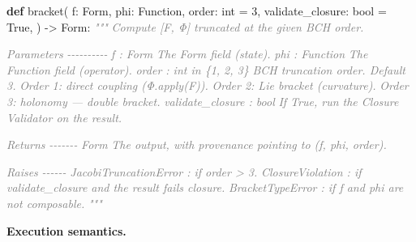\documentclass[11pt,a4paper]{article}
\newenvironment{Shaded}{\begin{snugshade}\small}{\end{snugshade}}
\newcommand{\KeywordTok}[1]{\textbf{#1}}
\newcommand{\DecValTok}[1]{#1}
\newcommand{\CommentTok}[1]{\textit{\textcolor{gray}{#1}}}
\newcommand{\VariableTok}[1]{#1}
\newcommand{\OperatorTok}[1]{#1}
\newcommand{\BuiltInTok}[1]{#1}
\newcommand{\NormalTok}[1]{#1}
\begin{document}
\begin{Shaded}
\begin{Highlighting}[]
\KeywordTok{def}\NormalTok{ bracket(}
\NormalTok{    f: Form,}
\NormalTok{    phi: Function,}
\NormalTok{    order: }\BuiltInTok{int} \OperatorTok{=} \DecValTok{3}\NormalTok{,}
\NormalTok{    validate\_closure: }\BuiltInTok{bool} \OperatorTok{=} \VariableTok{True}\NormalTok{,}
\NormalTok{) }\OperatorTok{{-}\textgreater{}}\NormalTok{ Form:}
    \CommentTok{"""}
\CommentTok{    Compute [F, Φ] truncated at the given BCH order.}

\CommentTok{    Parameters}
\CommentTok{    {-}{-}{-}{-}{-}{-}{-}{-}{-}{-}}
\CommentTok{    f : Form}
\CommentTok{        The Form field (state).}
\CommentTok{    phi : Function}
\CommentTok{        The Function field (operator).}
\CommentTok{    order : int in \{1, 2, 3\}}
\CommentTok{        BCH truncation order. Default 3.}
\CommentTok{        Order 1: direct coupling (Φ.apply(F)).}
\CommentTok{        Order 2: Lie bracket (curvature).}
\CommentTok{        Order 3: holonomy --- double bracket.}
\CommentTok{    validate\_closure : bool}
\CommentTok{        If True, run the Closure Validator on the result.}

\CommentTok{    Returns}
\CommentTok{    {-}{-}{-}{-}{-}{-}{-}}
\CommentTok{    Form}
\CommentTok{        The output, with provenance pointing to (f, phi, order).}

\CommentTok{    Raises}
\CommentTok{    {-}{-}{-}{-}{-}{-}}
\CommentTok{    JacobiTruncationError : if order \textgreater{} 3.}
\CommentTok{    ClosureViolation : if validate\_closure and the result fails closure.}
\CommentTok{    BracketTypeError : if f and phi are not composable.}
\CommentTok{    """}
\end{Highlighting}
\end{Shaded}

\textbf{Execution semantics.}
\end{document}
